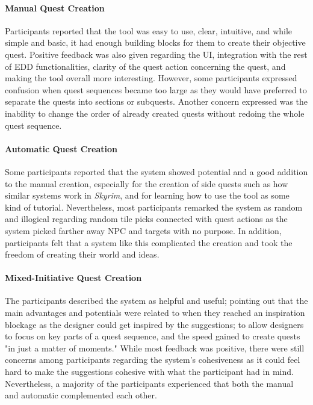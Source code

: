 \paragraph{Manual Quest Creation}

Participants reported that the tool was easy to use, clear, intuitive, and while simple and basic, it had enough building blocks for them to create their objective quest. Positive feedback was also given regarding the UI, integration with the rest of EDD functionalities, clarity of the quest action concerning the quest, and making the tool overall more interesting. However, some participants expressed confusion when quest sequences became too large as they would have preferred to separate the quests into sections or subquests. Another concern expressed was the inability to change the order of already created quests without redoing the whole quest sequence.

\paragraph{Automatic Quest Creation}

Some participants reported that the system showed potential and a good addition to the manual creation, especially for the creation of side quests such as how similar systems work in \emph{Skyrim}, and for learning how to use the tool as some kind of tutorial. Nevertheless, most participants remarked the system as random and illogical regarding random tile picks connected with quest actions as the system picked farther away NPC and targets with no purpose. In addition, participants felt that a system like this complicated the creation and took the freedom of creating their world and ideas. 

\paragraph{Mixed-Initiative Quest Creation}

The participants described the system as helpful and useful; pointing out that the main advantages and potentials were related to when they reached an inspiration blockage as the designer could get inspired by the suggestions; to allow designers to focus on key parts of a quest sequence, and the speed gained to create quests "in just a matter of moments." While most feedback was positive, there were still concerns among participants regarding the system's cohesiveness as it could feel hard to make the suggestions cohesive with what the participant had in mind. Nevertheless, a majority of the participants experienced that both the manual and automatic complemented each other.

